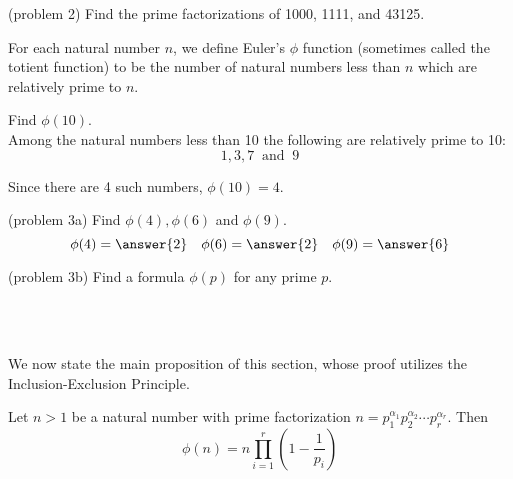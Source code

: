 \documentclass[handout]{ximera}
\begin{document}
\begin{problem}(problem 2)
Find the prime factorizations of 1000, 1111, and 43125.
\end{problem}



\begin{definition}
For each natural number $n$, we define Euler's $\phi$ function (sometimes called the totient function) to be the 
number of natural numbers less than $n$ which are relatively prime to $n$.
\end{definition}


\begin{example}[example 3]
Find $\phi(10)$.\\
Among the natural numbers less than 10 the following are relatively prime to 10: 
\[
1, 3, 7 \;\; 
\text{and} \;\; 9
\]

Since there are 4 such numbers, $\phi(10) = 4$.
\end{example}

\begin{problem}(problem 3a)
Find $\phi(4), \phi(6)$ and $\phi(9)$.\\
\[
\phi(4) = \answer{2} \quad \phi(6) = \answer{2} \quad \phi(9) = \answer{6}
\]
\end{problem}

\begin{problem}(problem 3b)
Find a formula $\phi(p)$ for any prime $p$.\\
\begin{multipleChoice}
\\
\\
\end{multipleChoice}
\end{problem}


We now state the main proposition of this section, whose proof utilizes the Inclusion-Exclusion Principle.





\begin{proposition}
Let $n>1$ be a natural number with prime factorization
$n = p_1^{\alpha_1}p_2^{\alpha_2} \cdots p_r^{\alpha_r}$.  Then
\[
\phi(n) = n \prod_{i = 1}^r \left(1 - \frac{1}{p_i}\right)
\]
\end{proposition}
\end{document}
